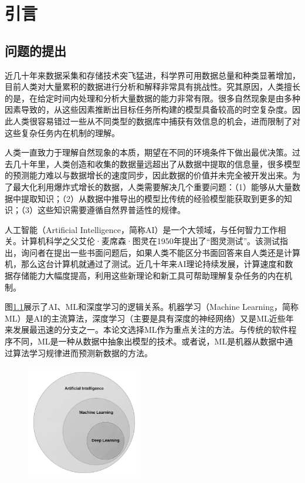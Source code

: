 \chapter{引言}\label{chap:introduction}

\section{问题的提出}\label{sec:intro_question}

近几十年来数据采集和存储技术突飞猛进，科学界可用数据总量和种类显著增加，目前人类对大量累积的数据进行分析和解释非常具有挑战性\citep{bougher2016machine}。究其原因，人类擅长的是，在给定时间内处理和分析大量数据的能力非常有限\citep{bougher2016machine}。很多自然现象是由多种因素导致的，从这些因素推断出目标任务所构建的模型具备较高的时空复杂度\citep{reitsma2010geoscience}。因此人类很容易错过一些从不同类型的数据库中捕获有效信息的机会，进而限制了对这些复杂任务内在机制的理解\citep{feyyad1996data}。

人类一直致力于理解自然现象的本质，期望在不同的环境条件下做出最优决策。过去几十年里，人类创造和收集的数据量远超出了从数据中提取的信息量，很多模型的预测能力难以与数据增长的速度同步，因此数据的价值并未完全被开发出来。为了最大化利用爆炸式增长的数据，人类需要解决几个重要问题：（1）能够从大量数据中提取知识；（2）从数据中推导出的模型比传统的经验模型能获取到更多的知识；（3）这些知识需要遵循自然界普适性的规律。

人工智能（Artificial Intelligence，简称AI）是一个大领域，与任何智力工作相关。计算机科学之父艾伦·麦席森·图灵在1950年提出了“图灵测试”。该测试指出，询问者在提出一些书面问题后，如果人类不能区分书面回答来自人类还是计算机，那么这台计算机就通过了测试\citep{turing2009computing}。近几十年来AI理论持续发展，计算速度和数据存储能力大幅度提高，利用这些新理论和新工具可帮助理解复杂任务的内在机制。

图\ref{fig:intro_AI_ML}展示了AI、ML和深度学习的逻辑关系。机器学习（Machine Learning，简称ML）是AI的主流算法，深度学习（主要是具有深度的神经网络）又是ML近些年来发展最迅速的分支之一。本论文选择ML作为重点关注的方法。与传统的软件程序不同，ML是一种从数据中抽象出模型的技术。或者说，ML是机器从数据中通过算法学习规律进而预测新数据的方法。

\begin{figure}[!htbp]
  \centering
  \noindent\includegraphics[width=0.45\textwidth]{Img/chap1_intro/AI_ML.png}
  \vspace{-0.6cm}
  \label{fig:intro_AI_ML}
\end{figure}

